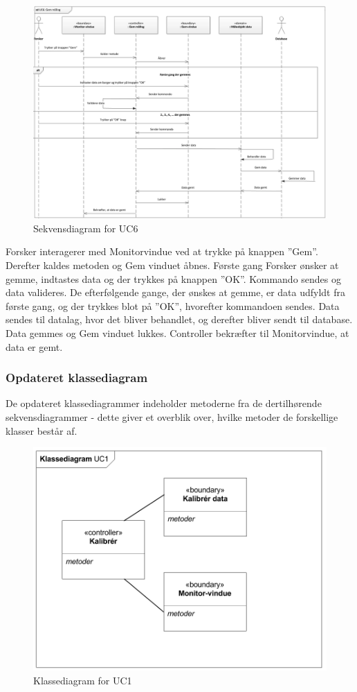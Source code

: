 \begin{figure}[H]
	\centering
	\includegraphics[width=1\textwidth]{Figurer/Snip20151104_36}
	\caption{Sekvensdiagram for UC6}
\end{figure}

Forsker interagerer med Monitorvindue ved at trykke på knappen ”Gem”. Derefter kaldes metoden og Gem vinduet åbnes. Første gang Forsker ønsker at gemme, indtastes data og der trykkes på knappen ”OK”. Kommando sendes og data valideres. De efterfølgende gange, der ønskes at gemme, er data udfyldt fra første gang, og der trykkes blot på ”OK”, hvorefter kommandoen sendes. Data sendes til datalag, hvor det bliver behandlet, og derefter bliver sendt til database. Data gemmes og Gem vinduet lukkes. Controller bekræfter til Monitorvindue, at data er gemt.

\subsubsection{Opdateret klassediagram}
De opdateret klassediagrammer indeholder metoderne fra de dertilhørende  sekvensdiagrammer - dette giver et overblik over, hvilke metoder de forskellige klasser består af.

\begin{figure}[H]
	\centering
	\includegraphics[width=1\textwidth]{Figurer/Snip20151104_37}
	\caption{Klassediagram for UC1}
\end{figure}
 

